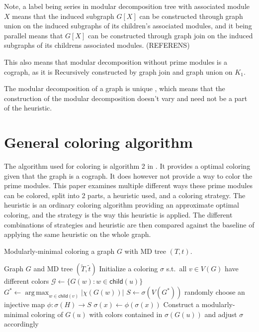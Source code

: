 \documentclass{amsart}
\newcommand{\child}{\mathsf{child}}
\DeclareMathOperator*{\argmax}{arg\,max}
\newcommand{\T}{\widetilde{T}}
\renewcommand{\t}{\widetilde{t}}
\begin{document}
Note, a label being series in modular decomposition tree with associated module
$X$ means that the induced subgraph $G[X]$ can be constructed through graph
union on the induced subgraphs of its children's associated modules, and it being
parallel means that $G[X]$ can be constructed through graph join on the
induced subgraphs of its childrens associated modules. (REFERENS)

This also means that modular decomposition without prime modules is a cograph, as 
it is Recursively constructed by graph join and graph union on $K_1$.

The modular decomposition of a graph is unique \cite{HCL}, which means that the
construction of the modular decomposition doesn't vary and need not be a part of
the heuristic.


\section{General coloring algorithm}

The algorithm used for coloring is algorithm 2 in \cite{HCL}. It provides a
optimal coloring given that the graph is a cograph. It does however not
provide a way to color the prime modules. This paper examines multiple different
ways these prime modules can be colored, split into 2 parts, a heuristic used,
and a coloring strategy. The heuristic is an ordinary coloring algorithm
providing an approximate optimal coloring, and the strategy is the way this
heuristic is applied. The different combinations of strategies and heuristic are
then compared against the baseline of applying the same heuristic on the whole
graph.

\begin{algorithm}[H]
  \caption{Modularly-minimal coloring a graph $G$ with MD tree $(T,t)$.}
  \label{alg:generic}
  \begin{algorithmic}[1]
    \REQUIRE Graph $G$ and MD tree $(\T,\t)$
    \STATE Initialize a coloring $\sigma$ s.t.\ all $v \in V(G)$
           have different colors
          \STATE $\mathcal{G} \leftarrow \{G(w)\colon w\in\child(u)\}$ 
          \STATE $G^* \leftarrow \argmax_{w\in\child(v)} |\chi(G(w))|$
          \STATE $S \leftarrow \sigma(V(G^*))$ 
             \STATE randomly choose an injective map $\phi:\sigma(H)\to S$
                \STATE $\sigma(x)\leftarrow \phi(\sigma(x))$  
             \ENDFOR
          \ENDFOR
          \STATE Construct a modularly-minimal coloring of $G(u)$
              with colors contained in $\sigma(G(u))$
              and adjust $\sigma$ accordingly 
       \ENDIF
    \ENDFOR
  \end{algorithmic}
\end{algorithm}
\end{document}
